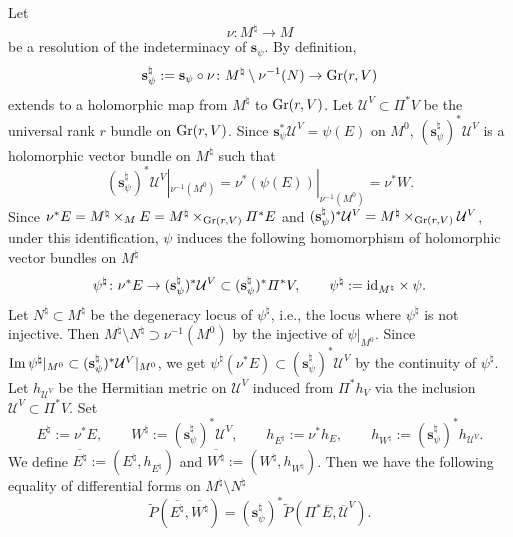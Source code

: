 \documentclass[amscd, leqno]{amsart}
\theoremstyle{plain}
\theoremstyle{definition}
\theoremstyle{remark}
\begin{document}
Let 
$$
\nu \colon M^{\natural} \to M
$$ 
be a resolution of the indeterminacy of ${\mathbf s}_{\psi}$. By definition,
$$
{\mathbf s}_{\psi}^{\natural} := {\mathbf s}_{\psi}\circ \nu \colon M^{\natural} \setminus \nu^{-1}(N) \to {\rm Gr}(r, V)
$$
extends to a holomorphic map from $M^{\natural}$ to ${\rm Gr}(r, V)$. 
Let ${\mathcal U}^{V} \subset \varPi^{*}V$ be the universal rank $r$ bundle on ${\rm Gr}(r, V)$. 
Since ${\mathbf s}_{\psi}^{*}{\mathcal U}^{V} = \psi(E)$ on $M^{0}$, 
$({\mathbf s}_{\psi}^{\natural})^{*}{\mathcal U}^{V}$ is a holomorphic vector bundle on $M^{\natural}$ such that
$$
({\mathbf s}_{\psi}^{\natural})^{*}{\mathcal U}^{V} |_{\nu^{-1}(M^{0})} = \nu^{*}(\psi(E)) |_{\nu^{-1}(M^{0})} = \nu^{*}W. 
$$
Since $\nu^{*}E = M^{\natural} \times_{M} E = M^{\natural} \times_{{\rm Gr}(r, V)} \varPi^{*}E$ and 
$({\mathbf s}_{\psi}^{\natural})^{*}{\mathcal U}^{V} = M^{\natural} \times_{{\rm Gr}(r, V)} {\mathcal U}^{V}$, under this identification,
$\psi$ induces the following homomorphism of holomorphic vector bundles on $M^{\natural}$
$$
\psi^{\natural} \colon \nu^{*}E \to 
({\mathbf s}_{\psi}^{\natural})^{*} {\mathcal U}^{V} \subset ({\mathbf s}_{\psi}^{\natural})^{*}\varPi^{*}V,
\qquad
\psi^{\natural} := {\rm id}_{M^{\natural}} \times \psi.
$$
Let $N^{\natural} \subset M^{\natural}$ be the degeneracy locus of $\psi^{\natural}$, i.e., the locus where $\psi^{\natural}$ is not injective. 
Then $M^{\natural} \setminus N^{\natural} \supset \nu^{-1}(M^{0})$ by the injective of $\psi|_{M^{0}}$.
Since ${\rm Im}\,\psi^{\natural}|_{M^{0}} \subset ({\mathbf s}_{\psi}^{\natural})^{*} {\mathcal U}^{V}|_{M^{0}}$, 
we get $\psi^{\natural}( \nu^{*}E ) \subset ({\mathbf s}_{\psi}^{\natural})^{*} {\mathcal U}^{V}$ by the continuity of $\psi^{\natural}$.
Let $h_{{\mathcal U}^{V}}$ be the Hermitian metric on ${\mathcal U}^{V}$ induced from $\varPi^{*}h_{V}$ via the inclusion 
${\mathcal U}^{V} \subset \varPi^{*}V$. 
Set
$$
{E}^{\natural} := \nu^{*}E,
\qquad
{W}^{\natural} := ({\mathbf s}_{\psi}^{\natural})^{*} {\mathcal U}^{V},
\qquad
h_{E^{\natural}} := \nu^{*}h_{E},
\qquad
h_{W^{\natural}} := ({\mathbf s}_{\psi}^{\natural})^{*}h_{{\mathcal U}^{V}}.
$$
We define $\overline{E^{\natural}} := (E^{\natural}, h_{E^{\natural}})$ and $\overline{W^{\natural}} := (W^{\natural}, h_{W^{\natural}})$.
Then we have the following equality of differential forms on $M^{\natural} \setminus N^{\natural}$
\begin{equation}
\label{eqn:BC:1}
\widetilde{P}(\overline{E^{\natural}}, \overline{W^{\natural}}) 
= ({\mathbf s}_{\psi}^{\natural})^{*}\widetilde{P}(\varPi^{*}\overline{E}, \overline{\mathcal U}^{V}).
\end{equation}
\end{document}
